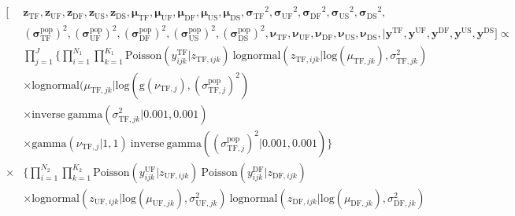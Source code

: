 \documentclass[12pt, oneside, titlepage]{article}   	%
\begin{document}
%


\begin{align}
  \begin{split}
  [ &  \bm{z_{\mathrm{TF}}} ,  \bm{z_{\mathrm{UF}}},  \bm{z_{\mathrm{DF}}},  \bm{z_{\mathrm{US}}},  \bm{z_{\mathrm{DS}}},  \bm{\mu_{\mathrm{TF}}} ,  \bm{\mu_{\mathrm{UF}}},  \bm{\mu_{\mathrm{DF}}},  \bm{\mu_{\mathrm{US}}},  \bm{\mu_{\mathrm{DS}}},   \bm{\sigma_{\mathrm{TF}}}^2 ,  \bm{\sigma_{\mathrm{UF}}}^2,  \bm{\sigma_{\mathrm{DF}}}^2,  \bm{\sigma_{\mathrm{US}}}^2,  \bm{\sigma_{\mathrm{DS}}}^2, \\ & ( \bm{\sigma^\mathrm{pop}_{\mathrm{TF}}})^2, ( \bm{\sigma^\mathrm{pop}_{\mathrm{UF}}})^2, ( \bm{\sigma^\mathrm{pop}_{\mathrm{DF}}})^2, ( \bm{\sigma^\mathrm{pop}_{\mathrm{US}}})^2, ( \bm{\sigma^\mathrm{pop}_{\mathrm{DS}}})^2,  \bm{\nu_{\mathrm{TF}}} ,  \bm{\nu_{\mathrm{UF}}},  \bm{\nu_{\mathrm{DF}}},  \bm{\nu_{\mathrm{US}}},  \bm{\nu_{\mathrm{DS}}}, |  \bm{y^{\mathrm{TF}}} , \bm{y^{\mathrm{UF}}} , \bm{y^{\mathrm{DF}}} , \bm{y^{\mathrm{US}}} , \bm{y^{\mathrm{DS}}} ]  \propto  \\  
 	     & \prod_{j=1}^{J}  \Big\{ \prod_{i=1}^{N_1}  \prod_{k=1}^{K_1}  \mathrm{Poisson} ( y^\mathrm{TF}_{ijk} | z_{\mathrm{TF},ijk} )\ \mathrm{lognormal} ( z_{\mathrm{TF},ijk} | \mathrm{log}(\mu_{\mathrm{TF},jk}), \sigma^2_{\mathrm{TF},jk} )  \\
	     & \times \mathrm{lognormal} ( \mu_{\mathrm{TF},jk} | \mathrm{log}(\mathrm{g}(\nu_{\mathrm{TF},j}), (\sigma^\mathrm{pop}_{\mathrm{TF},j} )^2)  \\
	     & \times \mathrm{inverse\ gamma} ( \sigma^2_{\mathrm{TF},jk}  | 0.001, 0.001 ) \\
	     & \times \mathrm{gamma} (\nu_{\mathrm{TF},j} | 1 , 1)\  \mathrm{inverse\ gamma} ( (\sigma^\mathrm{pop}_{\mathrm{TF},j} )^2 | 0.001, 0.001 ) \Big\}  \\
  \times &  \Big\{ \prod_{i=1}^{N_2}  \prod_{k=1}^{K_2}  \mathrm{Poisson} ( y^\mathrm{UF}_{ijk} | z_{\mathrm{UF},ijk} )\  \mathrm{Poisson} ( y^\mathrm{DF}_{ijk} | z_{\mathrm{DF},ijk} ) \\
  & \times  \mathrm{lognormal} ( z_{\mathrm{UF},ijk} | \mathrm{log}(\mu_{\mathrm{UF},jk}), \sigma^2_{\mathrm{UF},jk} )\ \mathrm{lognormal} ( z_{\mathrm{DF},ijk} | \mathrm{log}(\mu_{\mathrm{DF},jk}), \sigma^2_{\mathrm{DF},jk} )    \\

\end{split}
\end{align}
\end{document}
